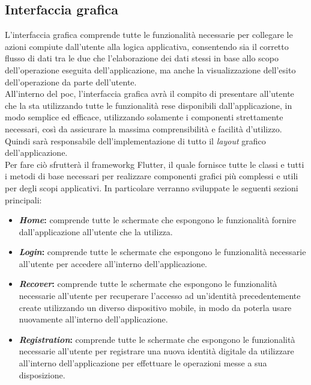 \subsection{Interfaccia grafica}

L'interfaccia grafica comprende tutte le funzionalità necessarie per collegare le azioni compiute dall'utente alla logica applicativa, consentendo sia il corretto flusso di dati tra le due che l'elaborazione dei dati stessi in base allo scopo dell'operazione eseguita dell'applicazione, ma anche la visualizzazione dell'esito dell'operazione da parte dell'utente.\\
All'interno del \gls{poc}, l'interfaccia grafica avrà il compito di presentare all'utente che la sta utilizzando tutte le funzionalità rese disponibili dall'applicazione, in modo semplice ed efficace, utilizzando solamente i componenti strettamente necessari, così da assicurare la massima comprensibilità e facilità d'utilizzo. Quindi sarà responsabile dell'implementazione di tutto il \textit{layout} grafico dell'applicazione.\\
Per fare ciò sfrutterà il \gls{frameworkg} Flutter, il quale fornisce tutte le classi e tutti i metodi di base necessari per realizzare componenti grafici più complessi e utili per degli scopi applicativi. In particolare verranno sviluppate le seguenti sezioni principali:

\begin{itemize}
	\item \textbf{\textit{Home}:} comprende tutte le schermate che espongono le funzionalità fornire dall'applicazione all'utente che la utilizza.
	\item \textbf{\textit{Login}:} comprende tutte le schermate che espongono le funzionalità necessarie all'utente per accedere all'interno dell'applicazione.
	\item \textbf{\textit{Recover}:} comprende tutte le schermate che espongono le funzionalità necessarie all'utente per recuperare l'accesso ad un'identità precedentemente create utilizzando un diverso dispositivo mobile, in modo da poterla usare nuovamente all'interno dell'applicazione.
	\item \textbf{\textit{Registration}:} comprende tutte le schermate che espongono le funzionalità necessarie all'utente per registrare una nuova identità digitale da utilizzare all'interno dell'applicazione per effettuare le operazioni messe a sua disposizione.
\end{itemize}

